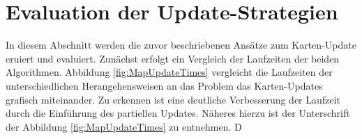 

\section{Evaluation der Update-Strategien}
\label{section:}

In diesem Abschnitt werden die zuvor beschriebenen Ansätze zum Karten-Update eruiert und evaluiert. Zunächst erfolgt ein Vergleich der Laufzeiten der beiden Algorithmen. Abbildung \ref{fig:MapUpdateTimes} vergleicht die Laufzeiten der unterschiedlichen Herangehensweisen an das Problem das Karten-Updates grafisch miteinander. Zu erkennen ist eine deutliche Verbesserung der Laufzeit durch die Einführung des partiellen Updates. Näheres hierzu ist der Unterschrift der Abbildung \ref{fig:MapUpdateTimes} zu entnehmen. D

